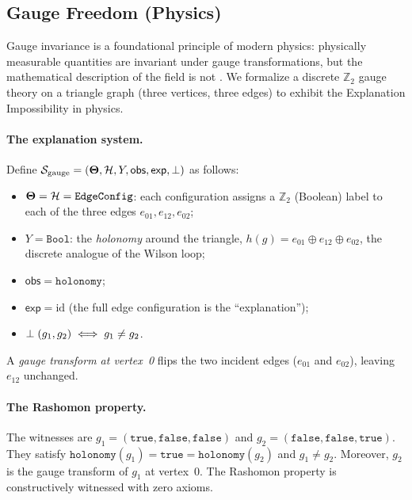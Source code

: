 \subsection{Gauge Freedom (Physics)}
\label{sec:instance-gauge-theory}

Gauge invariance is a foundational principle of modern physics: physically
measurable quantities are invariant under gauge transformations, but the
mathematical description of the field is not
\citep{jackson1999}.  We formalize a discrete $\mathbb{Z}_2$ gauge
theory on a triangle graph (three vertices, three edges) to exhibit the
Explanation Impossibility in physics.

\paragraph{The explanation system.}
Define $\mathcal{S}_{\mathrm{gauge}} = (\mathbf{\Theta}, \mathcal{H}, Y, \mathsf{obs},
\mathsf{exp}, \perp)$ as follows:
\begin{itemize}
  \item $\mathbf{\Theta} = \mathcal{H} = \texttt{EdgeConfig}$: each configuration assigns a
    $\mathbb{Z}_2$ (Boolean) label to each of the three edges
    $e_{01}, e_{12}, e_{02}$;
  \item $Y = \texttt{Bool}$: the \emph{holonomy} around the triangle,
    $h(g) = e_{01} \oplus e_{12} \oplus e_{02}$, the discrete analogue of
    the Wilson loop;
  \item $\mathsf{obs} = \texttt{holonomy}$;
  \item $\mathsf{exp} = \mathrm{id}$ (the full edge configuration is the
    ``explanation'');
  \item $\perp(g_1, g_2) \iff g_1 \ne g_2$.
\end{itemize}

A \emph{gauge transform at vertex~0} flips the two incident edges
($e_{01}$ and $e_{02}$), leaving $e_{12}$ unchanged.

\paragraph{The Rashomon property.}
The witnesses are $g_1 = (\mathtt{true}, \mathtt{false}, \mathtt{false})$
and $g_2 = (\mathtt{false}, \mathtt{false}, \mathtt{true})$.  They satisfy
$\texttt{holonomy}(g_1) = \mathtt{true} = \texttt{holonomy}(g_2)$ and
$g_1 \ne g_2$.  Moreover, $g_2$ is the gauge transform of $g_1$ at vertex~0.
The Rashomon property is constructively witnessed with zero axioms.

